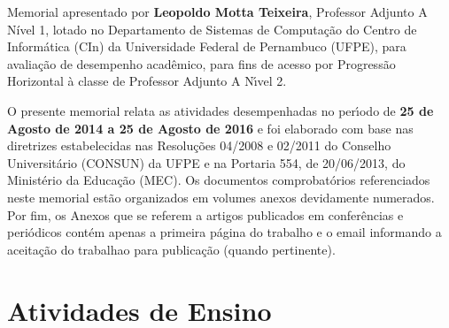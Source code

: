 \documentclass[a4paper,oneside,10pt]{article}
\newcounter{document}%
\begin{document}
\begin{onehalfspace}

Memorial apresentado por \textbf{Leopoldo Motta Teixeira}, Professor Adjunto A Nível 1, lotado no Departamento de Sistemas de Computação do Centro de Inform\'{a}tica (CIn) da Universidade Federal de Pernambuco (UFPE), para avalia\c{c}\~{a}o de desempenho acad\^{e}mico, para fins de acesso por Progress\~{a}o Horizontal \`{a} classe de Professor Adjunto A N\'{\i}vel 2.

O presente memorial relata as atividades desempenhadas no per\'{\i}odo de \textbf{25 de Agosto de 2014 a 25 de Agosto de 2016} e foi elaborado com base nas diretrizes estabelecidas nas Resolu\c{c}\~{o}es 04/2008 e 02/2011 do Conselho Universit\'{a}rio (CONSUN) da UFPE e na Portaria 554, de 20/06/2013, do Minist\'{e}rio da Educa\c{c}\~{a}o (MEC). Os documentos comprobat\'{o}rios referenciados neste memorial est\~{a}o organizados em volumes anexos devidamente numerados. Por fim, os Anexos que se referem a artigos publicados em confer\^{e}ncias e peri\'{o}dicos cont\'{e}m apenas a primeira p\'{a}gina do trabalho e o email informando a aceita\c{c}\~{a}o do trabalhao para publica\c{c}\~{a}o (quando pertinente).

\end{onehalfspace}

%
%
%
%


\newpage
\section{Atividades de Ensino}
\end{document}
